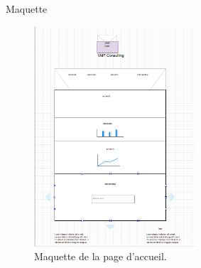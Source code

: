 \documentclass[french]{beamer}
\begin{document}
\begin{frame}{Maquette}
\begin{center}
\begin{figure}[htp]
  \centering
  \includegraphics[width=6cm]{mod2.png}
  \caption{Maquette de la page d'accueil.}
  \label{fig:une-autre-image}
\end{figure}

\end{center}
\end{frame}
\end{document}
